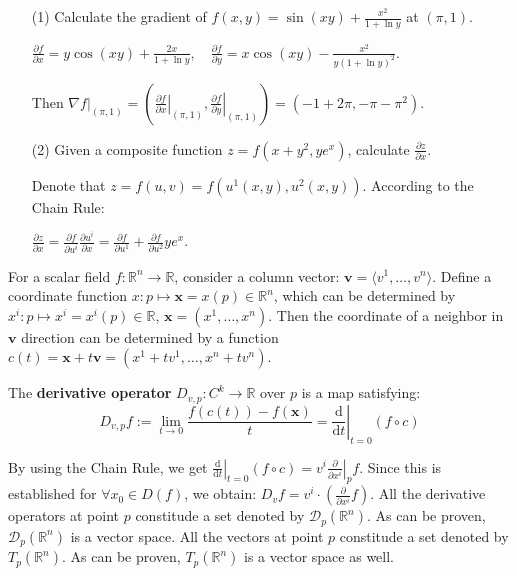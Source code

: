 \begin{example}
	\begin{itemize}
		\item[(1)] Calculate the gradient of $f(x,y)=\sin(xy)+\frac{x^2}{1+\ln y}$ at $(\pi,1)$.
		\begin{solution}
			$\frac{\partial f}{\partial x} = y\cos(xy)+\frac{2x}{1+\ln y},
			\quad \frac{\partial f}{\partial y} = x\cos(xy)-\frac{x^2}{y(1+\ln y)^2}$.

			Then $\nabla f|_{(\pi,1)}=(\left.\frac{\partial f}{\partial x}\right|_{(\pi,1)}, \left.\frac{\partial f}{\partial y}\right|_{(\pi,1)})=
			(-1+2\pi, -\pi-\pi^2)$.
		\end{solution}
		\item[(2)] Given a composite function $z=f(x+y^2, ye^x)$, calculate $\frac{\partial z}{\partial x}$.
		\begin{solution}
			Denote that $z=f(u,v)=f(u^1(x,y),u^2(x,y))$. According to the Chain Rule:
		
			$\frac{\partial z}{\partial x}=\frac{\partial f}{\partial u^i}\frac{\partial u^i}{\partial x}=\frac{\partial f}{\partial u^1}+\frac{\partial f}{\partial u^2}ye^x$.
		\end{solution}
	\end{itemize}
\end{example}

\begin{definition}
	For a scalar field $f: \mathbb{R}^n\to\mathbb{R}$, consider a column vector: $\bm{v}=\langle v^1,\dots,v^n\rangle$.
	Define a coordinate function $x: p\mapsto \bm{x}=x(p)\in\mathbb{R}^n$, which can be determined by $x^i: p\mapsto x^i=x^i(p)\in\mathbb{R}$, $\bm{x}=(x^1,\dots,x^n)$.
	Then the coordinate of a neighbor in $\bm{v}$ direction can be determined by a function $c(t)=\bm{x}+t\bm{v}=(x^1+tv^1,\dots,x^n+tv^n)$.

	The \textbf{derivative operator} $D_{v,p}: C^{k}\to\mathbb{R}$ over $p$ is a map satisfying:
	\[
		D_{v,p}f := \lim_{t\to 0}\frac{f(c(t))-f(\bm{x})}{t} =
		\left.\frac{\mathrm{d}}{\mathrm{d} t}\right|_{t=0} (f\circ c)
	\]
\end{definition}

By using the Chain Rule, we get $\left.\frac{\mathrm{d}}{\mathrm{d} t}\right|_{t=0} (f\circ c) = v^i \left.\frac{\partial}{\partial x^i}\right|_{p} f$.
Since this is established for $\forall x_0 \in D(f)$, we obtain:
$D_{v}f = v^i \cdot \left(\frac{\partial}{\partial x^i}f\right)$.
All the derivative operators at point $p$ constitude a set denoted by $\mathcal{D}_p(\mathbb{R}^n)$. As can be proven, $\mathcal{D}_p(\mathbb{R}^n)$ is a vector space.
All the vectors at point $p$ constitude a set denoted by $T_p(\mathbb{R}^n)$. As can be proven, $T_p(\mathbb{R}^n)$ is a vector space as well.

